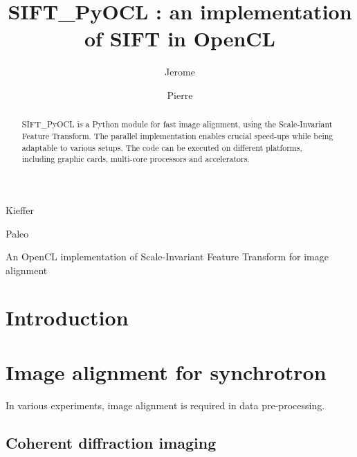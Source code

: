 \documentclass[preprint]{iucr}
\begin{document}
\title{SIFT\_PyOCL : an implementation of SIFT in OpenCL}

    \author[a]{Jerome}{Kieffer}
    \author[b]{Pierre}{Paleo}

\maketitle

\begin{synopsis}
An OpenCL implementation of Scale-Invariant Feature Transform for image alignment
\end{synopsis}

\begin{abstract}
SIFT\_PyOCL is a Python module for fast image alignment, using the Scale-Invariant Feature Transform. The parallel implementation enables crucial speed-ups while being adaptable to various setups. The code can be executed on different platforms, including graphic cards, multi-core processors and accelerators.
 
\end{abstract}

\section{Introduction}

\section{Image alignment for synchrotron}
In various experiments, image alignment is required in data pre-processing.
\subsection{Coherent diffraction imaging}
\end{document}
